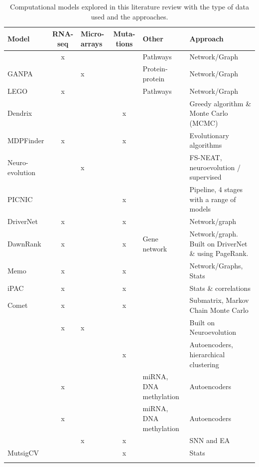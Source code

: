 \begin{center}
\small
\begin{longtable}{|p{2.8cm}|c|p{1.2cm}|c|p{2.0cm}|p{4.2cm}|}
    \hline \textbf{Model} 
    & \multicolumn{1}{p{1.0cm}|}{\textbf{RNA-seq}} 
    & \multicolumn{1}{p{1.2cm}|}{\textbf{Micro-arrays}} 
    & \multicolumn{1}{p{1.0cm}|}{\textbf{Muta-tions}} 
    & \textbf{Other}
    & \textbf{Approach}  \\ \hline  \hline
    \endfirsthead
    \endlastfoot    
    \citet{Cava2018-rv} & x &  &  & Pathways & Network/Graph \\ \hline
    GANPA &  & x &  & Protein-protein & Network/Graph \\ \hline
    LEGO & x &  &  & Pathways & Network/Graph \\ \hline
    Dendrix &  &  & x &  & Greedy algorithm \& Monte Carlo (MCMC) \\ \hline
    MDPFinder & x &  & x &  & Evolutionary algorithms \\ \hline
    Neuro-evolution &  & x &  &  & FS-NEAT, neuroevolution / supervised \\ \hline
    PICNIC  &  &  & x &  & Pipeline, 4 stages with a range of models \\ \hline
    DriverNet & x &  & x &  & Network/graph \\ \hline
    DawnRank & x &  & x & Gene network & Network/graph. Built on DriverNet \& using PageRank. \\ \hline
    Memo & x &  & x &  & Network/Graphs, Stats \\ \hline
    iPAC & x &  & x &  & Stats \& correlations \\ \hline
    Comet  & x &  & x &  & Submatrix, Markov Chain Monte Carlo  \\ \hline
    \citet{Feltes2019-bd} & x & x &  &  & Built on Neuroevolution \\ \hline
    \citet{Palazzo2019-hx} &  &  & x &  & Autoencoders, hierarchical clustering \\ \hline
    \citet{Chaudhary2018-qj} & x &  &  & miRNA, DNA methylation & Autoencoders \\ \hline
    \citet{Ma2019-hk} & x &  &  & miRNA, DNA methylation & Autoencoders \\ \hline
    \citet{Capecci2020-uj} &  & x & x &  & SNN and EA \\ \hline
    MutsigCV &  &  & x &  & Stats \\ \hline
    \caption[Summary of the computational models explored]{Computational models explored in this literature review with the type of data used and the approaches.}
    \label{tab:data_used}
\end{longtable}
\end{center}
    

